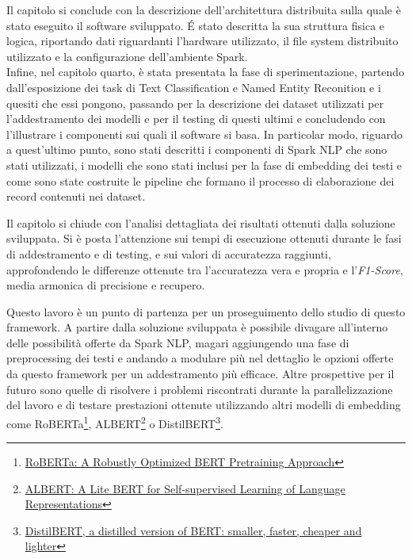 Il capitolo si conclude con la descrizione dell'architettura distribuita sulla quale è stato eseguito il software sviluppato. É stato descritta la sua struttura fisica e logica, riportando dati riguardanti l'hardware utilizzato, il file system distribuito utilizzato e la configurazione dell'ambiente Spark.\\

Infine, nel capitolo quarto, è stata presentata la fase di sperimentazione, partendo dall'esposizione dei task di Text Classification e Named Entity Reconition e i quesiti che essi pongono, passando per la descrizione dei dataset utilizzati per l'addestramento dei modelli e per il testing di questi ultimi e concludendo con l'illustrare i componenti sui quali il software si basa. 
In particolar modo, riguardo a quest'ultimo punto, sono stati descritti i componenti di Spark NLP che sono stati utilizzati, i modelli che sono stati inclusi per la fase di embedding dei testi e come sono state costruite le pipeline che formano il processo di elaborazione dei record contenuti nei dataset.

Il capitolo si chiude con l'analisi dettagliata dei risultati ottenuti dalla soluzione sviluppata. Si è posta l'attenzione sui tempi di esecuzione ottenuti durante le fasi di addestramento e di testing, e sui valori di accuratezza raggiunti, approfondendo le differenze ottenute tra l'accuratezza vera e propria e l'\textit{F1-Score}, media armonica di precisione e recupero.

Questo lavoro è un punto di partenza per un proseguimento dello studio di questo framework. A partire dalla soluzione sviluppata è possibile divagare all'interno delle possibilità offerte da Spark NLP, magari aggiungendo una fase di preprocessing dei testi e andando a modulare più nel dettaglio le opzioni offerte da questo framework per un addestramento più efficace. Altre prospettive per il futuro sono quelle di risolvere i problemi riscontrati durante la parallelizzazione del lavoro e di testare prestazioni ottenute utilizzando altri modelli di embedding come RoBERTa\footnote{\href{https://arxiv.org/abs/1907.11692}{RoBERTa: A Robustly Optimized BERT Pretraining Approach}}, ALBERT\footnote{\href{https://arxiv.org/abs/1909.11942}{ALBERT: A Lite BERT for Self-supervised Learning of Language Representations}} o DistilBERT\footnote{\href{https://arxiv.org/abs/1910.01108}{DistilBERT, a distilled version of BERT: smaller, faster, cheaper and lighter}}. 
